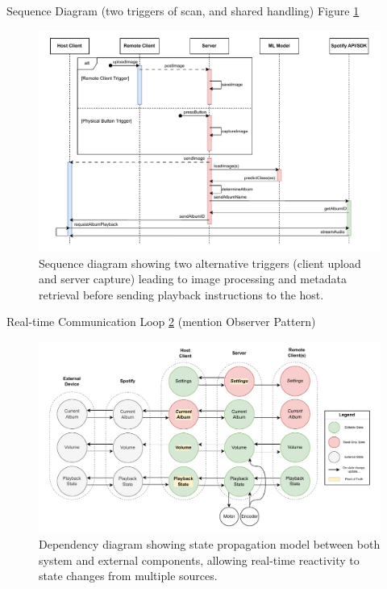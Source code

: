             \begin{temp}
                Sequence Diagram (two triggers of scan, and shared handling) Figure \ref{fig:imageSequenceDiagram}
            \end{temp}
    
            \begin{figure}[h]
                \centering
                \includegraphics[width=\textwidth]{images/VTT_imageScan.SequenceDiagram.pdf}
                \caption{Sequence diagram showing two alternative triggers (client upload and server capture) leading to image processing and metadata retrieval before sending playback instructions to the host.}
                \label{fig:imageSequenceDiagram}
            \end{figure}
    
            \begin{temp}
                Real-time Communication Loop \ref{fig:statePropagationDiagram} (mention Observer Pattern)
            \end{temp}
    
            \begin{figure}[h]
                \centering
                \includegraphics[width=\textwidth]{images/VTT_states.DependencyGraph.pdf}
                \caption{Dependency diagram showing state propagation model between both system and external components, allowing real-time reactivity to state changes from multiple sources.}
                \label{fig:statePropagationDiagram}
            \end{figure}
        
